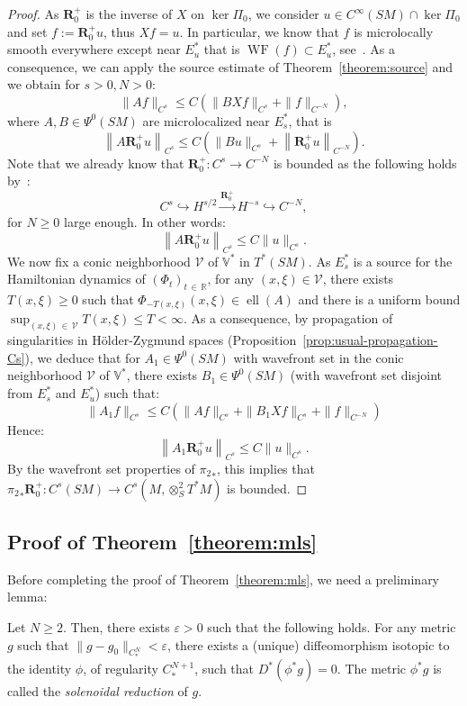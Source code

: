 \documentclass[AHL,Unicode,longabstracts,published]{cedram}
\newcommand{\R}{\mathbb{R}}
\newcommand{\RR}{\mathbf{R}}
\newcommand{\V}{\mathbb{V}}
\newcommand{\eps}{\varepsilon}
\newcommand{\mc}{\mathcal}
\DeclareMathOperator{\Ell}{ell}
\DeclareMathOperator{\WF}{WF}
\begin{document}
\begin{proof}
As $\RR_0^+$ is the inverse of $X$ on $\ker \Pi_0$, we consider $u \in C^\infty(SM) \cap \ker \Pi_0$ and set $f := \RR_0^+ u$, thus $Xf = u$. In particular, we know that $f$ is microlocally smooth everywhere except near $E_u^*$ that is $\WF(f) \subset E_u^*$, see~\cite[Proposition~3.3]{Dyatlov-Zworski-16}. As a consequence, we can apply the source estimate of Theorem~\ref{theorem:source} and we obtain for $s > 0, N > 0$:
\[
\|Af\|_{C^s} \leq C\left(\|BXf\|_{C^{s}} + \|f\|_{C^{-N}} \right),
\]
where $A,B \in \Psi^0(SM)$ are microlocalized near $E_s^*$, that is
\[
\left\|A \RR_0^+ u\right\|_{C^s} \leq C\left(\|B u\|_{C^{s}} + \left\|\RR_0^+ u\right\|_{C^{-N}} \right).
\]
Note that we already know that $\RR_0^+ : C^s \rightarrow C^{-N}$ is bounded as the following holds by~\cite[Theorem~2.6]{Guillarmou-17-1}: 
\[
C^s \hookrightarrow H^{s/2} \overset{\RR_0^+}{\rightarrow} H^{-s} \hookrightarrow C^{-N}, 
\]
for $N \geq 0$ large enough. In other words:
\[
\left\|A \RR_0^+ u\right\|_{C^s} \leq C\|u\|_{C^s}.
\]
We now fix a conic neighborhood $\mc{V}$ of $\V^*$ in $T^*(SM)$. As $E_s^*$ is a source for the Hamiltonian dynamics of $(\Phi_t)_{t\,\in \,\R}$, for any $(x,\xi) \in \mc{V}$, there exists $T(x,\xi) \geq 0$ such that $\Phi_{-T(x,\xi)}(x,\xi) \in \Ell(A)$ and there is a uniform bound $\sup_{(x,\xi)\,\in\,\mc{V}} T(x,\xi) \leq T < \infty$. As a consequence, by propagation of singularities in H\"older-Zygmund spaces (Proposition~\ref{prop:usual-propagation-Cs}), we deduce that for $A_1 \in \Psi^0(SM)$ with wavefront set in the conic neighborhood $\mc{V}$ of $\V^*$, there exists $B_1 \in \Psi^0(SM)$ (with wavefront set disjoint from $E_s^*$ and $E_u^*$) such that:
\[
\|A_1f\|_{C^s} \leq C\left(\|Af\|_{C^s} + \|B_1Xf\|_{C^s} + \|f\|_{C^{-N}} \right)
\]
Hence:
\[
\left\|A_1 \RR_0^+ u\right\|_{C^s} \leq C \|u\|_{C^s}.
\]
By the wavefront set properties of ${\pi_2}_*$, this implies that ${\pi_2}_* \RR_0^+ : C^s(SM) \rightarrow C^s(M,\otimes^2_S T^*M)$ is bounded.
\end{proof}

\subsection{Proof of Theorem~\ref{theorem:mls}}
Before completing the proof of Theorem~\ref{theorem:mls}, we need a preliminary lemma:

\begin{lemm}\label{lemma:reduction}
Let $N \geq 2$. Then, there exists $\eps > 0$ such that the following holds. For any metric $g$ such that $\|g-g_0\|_{C_*^N} < \eps$, there exists a (unique) diffeomorphism isotopic to the identity $\phi$, of regularity $C_*^{N+1}$, such that $D^*(\phi^*g) = 0$. The metric $\phi^*g$ is called the \emph{solenoidal reduction} of $g$.
\end{lemm}
\end{document}

